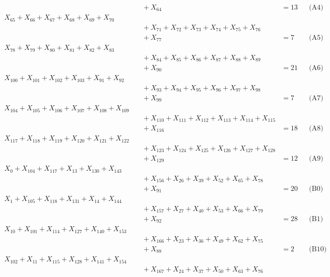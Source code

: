 \documentclass[a4paper,10pt]{article}
\begin{document}
{\begin{align}
&\quad  + X_{64} &= 13 && \text{(A4)} \\
X_{65} + X_{66} + X_{67} + X_{68} + X_{69} + X_{70} \\[0.5ex]
&\quad  + X_{71} + X_{72} + X_{73} + X_{74} + X_{75} + X_{76} \\[0.5ex]
&\quad  + X_{77} &= 7 && \text{(A5)} \\
X_{78} + X_{79} + X_{80} + X_{81} + X_{82} + X_{83} \\[0.5ex]
&\quad  + X_{84} + X_{85} + X_{86} + X_{87} + X_{88} + X_{89} \\[0.5ex]
&\quad  + X_{90} &= 21 && \text{(A6)} \\
X_{100} + X_{101} + X_{102} + X_{103} + X_{91} + X_{92} \\[0.5ex]
&\quad  + X_{93} + X_{94} + X_{95} + X_{96} + X_{97} + X_{98} \\[0.5ex]
&\quad  + X_{99} &= 7 && \text{(A7)} \\
X_{104} + X_{105} + X_{106} + X_{107} + X_{108} + X_{109} \\[0.5ex]
&\quad  + X_{110} + X_{111} + X_{112} + X_{113} + X_{114} + X_{115} \\[0.5ex]
&\quad  + X_{116} &= 18 && \text{(A8)} \\
X_{117} + X_{118} + X_{119} + X_{120} + X_{121} + X_{122} \\[0.5ex]
&\quad  + X_{123} + X_{124} + X_{125} + X_{126} + X_{127} + X_{128} \\[0.5ex]
&\quad  + X_{129} &= 12 && \text{(A9)} \\
X_{0} + X_{104} + X_{117} + X_{13} + X_{130} + X_{143} \\[0.5ex]
&\quad  + X_{156} + X_{26} + X_{39} + X_{52} + X_{65} + X_{78} \\[0.5ex]
&\quad  + X_{91} &= 20 && \text{(B0)} \\
X_{1} + X_{105} + X_{118} + X_{131} + X_{14} + X_{144} \\[0.5ex]
&\quad  + X_{157} + X_{27} + X_{40} + X_{53} + X_{66} + X_{79} \\[0.5ex]
&\quad  + X_{92} &= 28 && \text{(B1)} \\
X_{10} + X_{101} + X_{114} + X_{127} + X_{140} + X_{153} \\[0.5ex]
&\quad  + X_{166} + X_{23} + X_{36} + X_{49} + X_{62} + X_{75} \\[0.5ex]
&\quad  + X_{88} &= 2 && \text{(B10)} \\
X_{102} + X_{11} + X_{115} + X_{128} + X_{141} + X_{154} \\[0.5ex]
&\quad  + X_{167} + X_{24} + X_{37} + X_{50} + X_{63} + X_{76} \\[0.5ex]

\end{align}}
\end{document}
